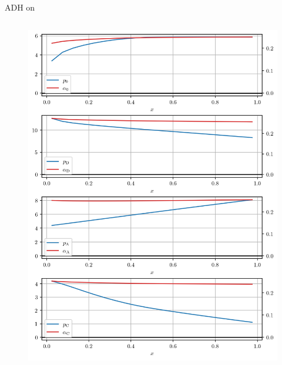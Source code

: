 \documentclass{beamer}
\begin{document}
\begin{frame}{ADH on}
    
\begin{columns}[T]

    \begin{column}{0.5\textwidth}
    \begin{figure}
        \centering
        \includegraphics[width=\textwidth]{results/4-7-2023/ADH_p_alpha.png}
    \end{figure}
    \end{column}
    

\end{columns}
\end{frame}
\end{document}
